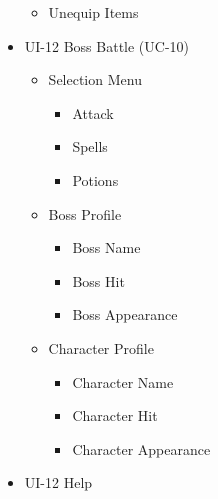 \documentclass[12pt]{report}
\renewcommand{\_}{\kern-1.5pt\textunderscore\kern-1.5pt}
\begin{document}
\begin{itemize}
\begin{itemize}
	\item Unequip Items\par


\end{itemize}
	\item UI-12 Boss Battle (UC-10)\par

\begin{itemize}
	\item Selection Menu\par

\begin{itemize}
	\item Attack\par

	\item Spells\par

	\item Potions\par


\end{itemize}
	\item Boss Profile\par

\begin{itemize}
	\item Boss Name\par

	\item Boss Hit\par

	\item Boss Appearance\par


\end{itemize}
	\item Character Profile\par

\begin{itemize}
	\item Character Name\par

	\item Character Hit\par

	\item Character Appearance\par


\end{itemize}
\end{itemize}
	\item UI-12 Help \par


\end{itemize}
\end{document}
